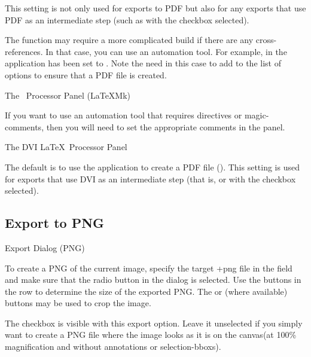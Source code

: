 This setting is not only used for exports to PDF but also for any
exports that use PDF as an intermediate step (such as
 with the  checkbox
selected).

The  function may
require a more complicated build if there are any cross-references.
In that case, you can use an automation tool. For example, in
 the application has been set to
. Note the need in this case to add  to the list of
options to ensure that a PDF file is created.

 {}
 {The \pdfLaTeX\ Processor Panel (LaTeXMk)}

If you want to use an automation tool that requires \glspl{directive}
or \glspl{magic-comment}, then you will need to set the appropriate
comments in the 
panel.


 {}
 {The DVI \LaTeX\ Processor Panel}

The default is to use the  application to create a PDF
file ().  This setting is used for exports
that use DVI as an intermediate step (that is, 
or  with the  checkbox
selected).

\subsection{Export to PNG}\label{sec:exportpng}


 {}
 {Export Dialog (PNG)}

To create a PNG of the current image, specify the target \ext+{png}
file in the  field and make sure that the 
radio button in the  dialog is selected. 
Use the buttons in the  row to determine the
size of the exported PNG. The 
or (where available)  buttons may be
used to crop the image.

The  checkbox is visible with this export
option. Leave it unselected if you simply want to create a PNG file where the image
looks as it is  on the \gls{canvas}(at
100\% magnification and without annotations or
\glspl{selection-bbox}).

